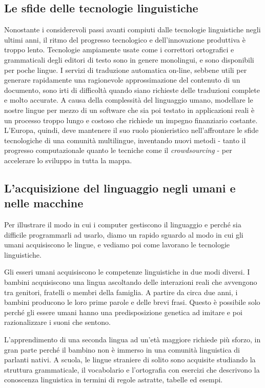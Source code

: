 \documentclass[]{../../metanetpaper}
\begin{document}
\begin{multicols}{2}
\subsection{Le sfide delle tecnologie linguistiche}

Nonostante i considerevoli passi avanti compiuti dalle tecnologie linguistiche
negli ultimi anni, il ritmo del progresso tecnologico e dell'innovazione
produttiva \`{e} troppo lento. Tecnologie ampiamente usate come i correttori
ortografici e grammaticali degli editori di testo sono in genere monolingui, e
sono disponibili per poche lingue. I servizi di traduzione automatica on-line,
sebbene utili per  generare rapidamente una ragionevole approssimazione del
contenuto di un documento, sono irti di difficolt\`{a} quando siano richieste
delle traduzioni complete e molto accurate. A causa della complessit\`{a} del
linguaggio umano, modellare le nostre lingue per mezzo di un software che sia
poi testato in applicazioni reali \`{e} un processo troppo lungo e costoso che
richiede un impegno finanziario costante. L'Europa, quindi, deve mantenere il
suo ruolo pionieristico nell'affrontare le sfide tecnologiche di una
comunit\`{a} multilingue, inventando nuovi metodi - tanto il progresso
computazionale quanto le tecniche come il \emph{crowdsourcing} - per
accelerare lo sviluppo in tutta la mappa.




\subsection{L'acquisizione del linguaggio negli umani e nelle macchine}

Per illustrare il modo in cui i computer gestiscono il linguaggio e perch\'{e}
sia difficile programmarli ad usarlo, diamo un rapido sguardo al modo in cui
gli umani acquisiscono le lingue, e vediamo poi come lavorano le tecnologie
linguistiche.

Gli esseri umani acquisiscono le competenze linguistiche in due modi
diversi. I bambini acquisiscono una lingua ascoltando delle interazioni reali
che avvengono tra genitori, fratelli o membri della famiglia. A partire da
circa due anni, i bambini producono le loro prime parole e delle brevi
frasi. Questo \`{e} possibile solo perch\'{e} gli essere umani hanno una
predisposizione genetica ad imitare e poi razionalizzare i suoni che sentono.

L'apprendimento di una seconda lingua ad un'et\`{a} maggiore richiede pi\`{u}
sforzo, in gran parte perch\'{e} il bambino non \`{e} immerso in una
comunit\`{a} linguistica di parlanti nativi. A scuola, le lingue straniere di
solito sono acquisite studiando la struttura grammaticale, il vocabolario e
l'ortografia con esercizi che descrivono la conoscenza linguistica in termini
di regole astratte, tabelle ed esempi.


\end{multicols}
\end{document}
